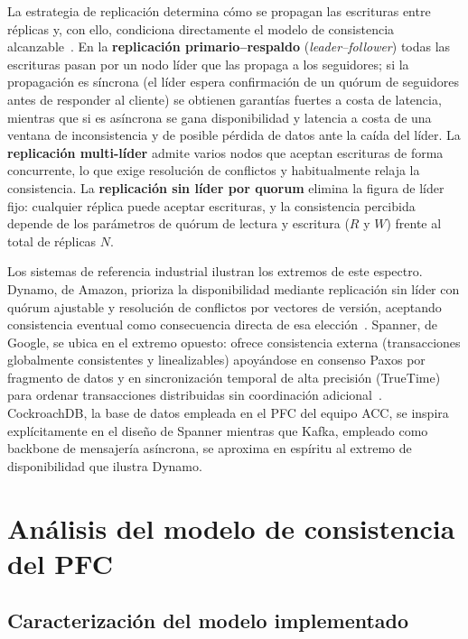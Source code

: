 \documentclass[11pt,a4paper]{article}
\begin{document}
La estrategia de replicaci\'on determina c\'omo se propagan las escrituras entre r\'eplicas y, con
ello, condiciona directamente el modelo de consistencia alcanzable~\cite{vansteen2017}. En la
\textbf{replicaci\'on primario--respaldo} (\emph{leader--follower}) todas las escrituras pasan por
un nodo l\'ider que las propaga a los seguidores; si la propagaci\'on es s\'incrona (el l\'ider
espera confirmaci\'on de un qu\'orum de seguidores antes de responder al cliente) se obtienen
garant\'ias fuertes a costa de latencia, mientras que si es as\'incrona se gana disponibilidad y
latencia a costa de una ventana de inconsistencia y de posible p\'erdida de datos ante la ca\'ida
del l\'ider. La \textbf{replicaci\'on multi-l\'ider} admite varios nodos que aceptan escrituras de
forma concurrente, lo que exige resoluci\'on de conflictos y habitualmente relaja la consistencia.
La \textbf{replicaci\'on sin l\'ider por quorum} elimina la figura de l\'ider fijo: cualquier
r\'eplica puede aceptar escrituras, y la consistencia percibida depende de los par\'ametros de
qu\'orum de lectura y escritura ($R$ y $W$) frente al total de r\'eplicas $N$.

Los sistemas de referencia industrial ilustran los extremos de este espectro. Dynamo, de Amazon,
prioriza la disponibilidad mediante replicaci\'on sin l\'ider con qu\'orum ajustable y resoluci\'on
de conflictos por vectores de versi\'on, aceptando consistencia eventual como consecuencia directa
de esa elecci\'on~\cite{decandia2007}. Spanner, de Google, se ubica en el extremo opuesto: ofrece
consistencia externa (transacciones globalmente consistentes y linealizables) apoy\'andose en
consenso Paxos por fragmento de datos y en sincronizaci\'on temporal de alta precisi\'on
(TrueTime) para ordenar transacciones distribuidas sin coordinaci\'on adicional~\cite{corbett2013}.
CockroachDB, la base de datos empleada en el PFC del equipo ACC, se inspira expl\'icitamente en el
dise\~no de Spanner mientras que Kafka, empleado como backbone de mensajer\'ia as\'incrona, se
aproxima en esp\'iritu al extremo de disponibilidad que ilustra Dynamo.

\section{An\'alisis del modelo de consistencia del PFC}
\label{sec:analisis}

\subsection{Caracterizaci\'on del modelo implementado}
\label{subsec:caracterizacion}
\end{document}
